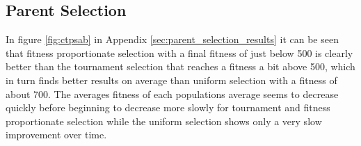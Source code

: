 

\subsection{Parent Selection} %
\label{sub:parent_selection}

In figure \ref{fig:ctpsab} in Appendix \ref{sec:parent_selection_results} it can be seen that fitness proportionate selection with a final fitness of just below 500 is clearly better than the tournament selection that reaches a fitness a bit above 500, which in turn finds better results on average than uniform selection with a fitness of about 700. The averages fitness of each populations average seems to decrease quickly before beginning to decrease more slowly for tournament and fitness proportionate selection while the uniform selection shows only a very slow improvement over time.




